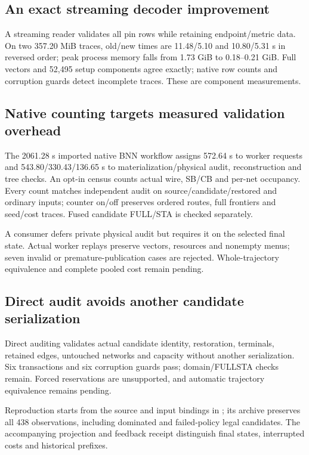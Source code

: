\documentclass[conference,10pt]{IEEEtran}
\begin{document}
\subsection{An exact streaming decoder improvement}
A streaming reader validates all pin rows while retaining endpoint/metric data. On two 357.20 MiB traces, old/new times are 11.48/5.10 and 10.80/5.31 s in reversed order; peak process memory falls from 1.73 GiB to 0.18--0.21 GiB. Full vectors and 52,495 setup components agree exactly; native row counts and corruption guards detect incomplete traces. These are component measurements.

\subsection{Native counting targets measured validation overhead}
The 2061.28 s imported native BNN workflow assigns 572.64 s to worker requests and 543.80/330.43/136.65 s to materialization/physical audit, reconstruction and tree checks. An opt-in census counts actual wire, SB/CB and per-net occupancy. Every count matches independent audit on source/candidate/restored and ordinary inputs; counter on/off preserves ordered routes, full frontiers and seed/cost traces. Fused candidate FULL/STA is checked separately.

A consumer defers private physical audit but requires it on the selected final state. Actual worker replays preserve vectors, resources and nonempty menus; seven invalid or premature-publication cases are rejected. Whole-trajectory equivalence and complete pooled cost remain pending.

\subsection{Direct audit avoids another candidate serialization}
Direct auditing validates actual candidate identity, restoration, terminals, retained edges, untouched networks and capacity without another serialization. Six transactions and six corruption guards pass; domain/FULLSTA checks remain. Forced reservations are unsupported, and automatic trajectory equivalence remains pending.

Reproduction starts from the source and input bindings in ; its archive preserves all 438 observations, including dominated and failed-policy legal candidates. The accompanying projection and feedback receipt distinguish final states, interrupted costs and historical prefixes.
\end{document}
